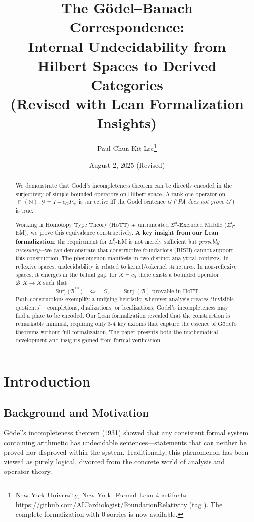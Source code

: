 \documentclass[11pt]{article}
\title{The Gödel--Banach Correspondence:\\
  Internal Undecidability from Hilbert Spaces to Derived Categories\\
  \large (Revised with Lean Formalization Insights)}
\author{Paul Chun-Kit Lee\thanks{New York University, New York. Formal Lean 4 artifacts: \url{https://github.com/AICardiologist/FoundationRelativity}
(tag \leanRepoTag). The complete formalization with 0 sorries is now available.}}
\date{August 2, 2025 (Revised)}
\theoremstyle{definition}
\newcommand{\N}{\mathbb{N}}
\newcommand{\lp}{\ell^{2}(\N)}
\newcommand{\SigOne}{\Sigma^{0}_{\!1}}
\DeclareMathOperator{\Surj}{Surj}
\begin{document}
\maketitle

\begin{abstract}
\noindent
We demonstrate that Gödel's incompleteness theorem can be directly encoded in the surjectivity of simple bounded operators on Hilbert space. A rank-one operator on $\lp$, $\mathcal G = I - c_{G}P_{g}$, is surjective iff the Gödel sentence $G$ (`\emph{PA does not prove $G$}') is true.

Working in Homotopy Type Theory (HoTT) + untruncated $\SigOne$-Excluded Middle ($\SigOne$-EM), we prove this equivalence constructively. \textbf{A key insight from our Lean formalization}: the requirement for $\SigOne$-EM is not merely sufficient but \emph{provably necessary}---we can demonstrate that constructive foundations (BISH) cannot support this construction. The phenomenon manifests in two distinct analytical contexts. In reflexive spaces, undecidability is related to kernel/cokernel structures. In non-reflexive spaces, it emerges in the bidual gap: for $X = c_{0}$ there exists a bounded operator $\mathcal B : X \to X$ such that
\[
  \Surj\bigl(\mathcal B^{**}\bigr) \quad\Longleftrightarrow\quad G,
  \qquad
  \Surj(\mathcal B) \text{ provable in HoTT.}
\]
Both constructions exemplify a unifying heuristic: wherever analysis creates ``invisible quotients''---completions, dualizations, or localizations; Gödel's incompleteness may find a place to be encoded. Our Lean formalization revealed that the construction is remarkably minimal, requiring only 3-4 key axioms that capture the essence of Gödel's theorems without full formalization. The paper presents both the mathematical development and insights gained from formal verification.
\end{abstract}

\section{Introduction}

\subsection{Background and Motivation}

Gödel's incompleteness theorem (1931) showed that any consistent formal system containing arithmetic has undecidable sentences---statements that can neither be proved nor disproved within the system. Traditionally, this phenomenon has been viewed as purely logical, divorced from the concrete world of analysis and operator theory.
\end{document}
